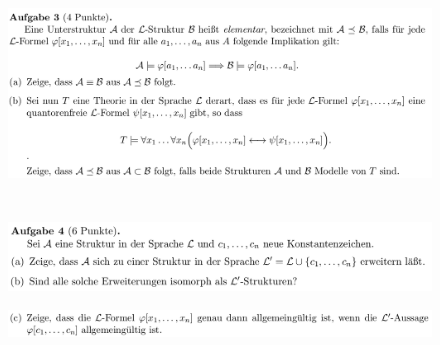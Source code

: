 \documentclass[a4paper]{scrartcl}
\begin{document}
\section*{}%
\label{sec:aufgabe_3}

    \begin{figure}[H]
        \centering
        \includegraphics[scale=0.3]{./A-3.png}
        \label{fig:}
    \end{figure}

\section*{}%
\label{sec:aufgabe_4}

    \begin{figure}[H]
        \centering
        \includegraphics[scale=0.3]{./A-4-1.png}
        \label{fig:}
    \end{figure}

    \begin{figure}[H]
        \centering
        \includegraphics[scale=0.3]{./A-4-2.png}
        \label{fig:}
    \end{figure}
\end{document}
